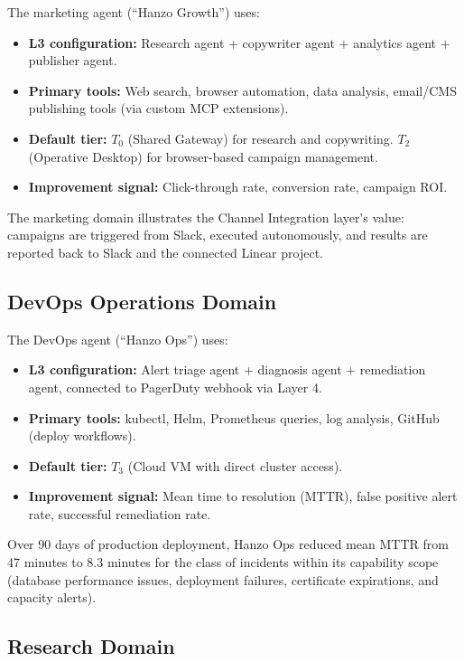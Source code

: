 The marketing agent (``Hanzo Growth'') uses:
\begin{itemize}[leftmargin=1.5em]
    \item \textbf{L3 configuration:} Research agent + copywriter agent +
          analytics agent + publisher agent.
    \item \textbf{Primary tools:} Web search, browser automation, data
          analysis, email/CMS publishing tools (via custom MCP extensions).
    \item \textbf{Default tier:} $T_0$ (Shared Gateway) for research and
          copywriting. $T_2$ (Operative Desktop) for browser-based campaign
          management.
    \item \textbf{Improvement signal:} Click-through rate, conversion rate,
          campaign ROI.
\end{itemize}

The marketing domain illustrates the Channel Integration layer's value:
campaigns are triggered from Slack, executed autonomously, and results are
reported back to Slack and the connected Linear project.

\subsection{DevOps Operations Domain}

The DevOps agent (``Hanzo Ops'') uses:
\begin{itemize}[leftmargin=1.5em]
    \item \textbf{L3 configuration:} Alert triage agent + diagnosis agent +
          remediation agent, connected to PagerDuty webhook via Layer 4.
    \item \textbf{Primary tools:} kubectl, Helm, Prometheus queries, log
          analysis, GitHub (deploy workflows).
    \item \textbf{Default tier:} $T_3$ (Cloud VM with direct cluster access).
    \item \textbf{Improvement signal:} Mean time to resolution (MTTR),
          false positive alert rate, successful remediation rate.
\end{itemize}

Over 90 days of production deployment, Hanzo Ops reduced mean MTTR from 47
minutes to 8.3 minutes for the class of incidents within its capability scope
(database performance issues, deployment failures, certificate expirations,
and capacity alerts).

\subsection{Research Domain}

